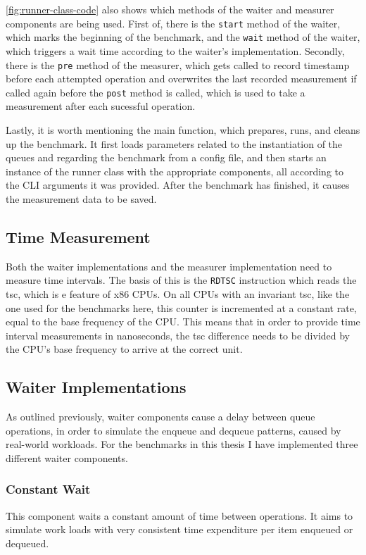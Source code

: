 \autoref{fig:runner-class-code} also shows which methods of the waiter and measurer components are being used.
First of, there is the \texttt{start} method of the waiter, which marks the beginning of the benchmark,
and the \texttt{wait} method of the waiter, which triggers a wait time according to the waiter's implementation.
Secondly, there is the \texttt{pre} method of the measurer, which gets called to record timestamp before each
attempted operation and overwrites the last recorded measurement if called again before the \texttt{post}
method is called, which is used to take a measurement after each sucessful operation.

Lastly, it is worth mentioning the main function, which prepares, runs, and cleans up the benchmark.
It first loads parameters related to the instantiation of the queues and regarding the benchmark from a config file,
and then starts an instance of the runner class with the appropriate components, all according to the CLI
arguments it was provided.
After the benchmark has finished, it causes the measurement data to be saved.

\subsection{Time Measurement}
Both the waiter implementations and the measurer implementation need to measure time intervals.
The basis of this is the \texttt{RDTSC} instruction which reads the \acrfull{tsc}, which is e
feature of x86 CPUs.
On all CPUs with an invariant \acrshort{tsc}, like the one used for the benchmarks here, this counter is incremented at
a constant rate, equal to the base frequency of the CPU.
This means that in order to provide time interval measurements in nanoseconds, the \acrshort{tsc} difference needs to be
divided by the CPU's base frequency to arrive at the correct unit.

\subsection{Waiter Implementations}
\label{sec:waiter-implementations}
As outlined previously, waiter components cause a delay between queue operations, in order to simulate the
enqueue and dequeue patterns, caused by real-world workloads.
For the benchmarks in this thesis I have implemented three different waiter components.

\subsubsection*{Constant Wait}
This component waits a constant amount of time between operations.
It aims to simulate work loads with very consistent time expenditure per item enqueued or dequeued.

